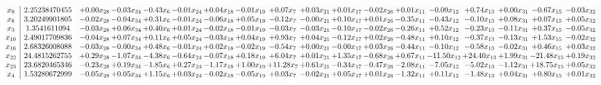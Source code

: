 \documentclass[9pt]{article}
\begin{document}
 \[\begin{array}{c| c c@{\hskip 2pt} c@{\hskip 2pt} c@{\hskip 2pt} c@{\hskip 2pt} c@{\hskip 2pt} c@{\hskip 2pt} c@{\hskip 2pt} c@{\hskip 2pt} c@{\hskip 2pt} c@{\hskip 2pt} c@{\hskip 2pt} c@{\hskip 2pt} c@{\hskip 2pt} c@{\hskip 2pt} c@{\hskip 2pt} c@{\hskip 2pt} }
 x_{9}   &  2.25238470455 & +  0.00 x_{28} & -0.03 x_{34} & -0.43 x_{6} & -0.01 x_{24} & +  0.04 x_{18} & -0.01 x_{19} & +  0.07 x_{7} & +  0.03 x_{21} & +  0.01 x_{17} & -0.02 x_{26} & +  0.01 x_{11} & -0.09 x_{12} & +  0.74 x_{13} & +  0.00 x_{31} & -0.67 x_{15} & -0.03 x_{32}\\
 x_{8}   &  3.20249901805 & -0.02 x_{28} & -0.04 x_{34} & +  0.31 x_{6} & -0.01 x_{24} & -0.06 x_{18} & +  0.05 x_{19} & -0.12 x_{7} & -0.00 x_{21} & +  0.10 x_{17} & +  0.01 x_{26} & -0.35 x_{11} & -0.43 x_{12} & -0.10 x_{13} & +  0.08 x_{31} & +  0.07 x_{15} & +  0.05 x_{32}\\
 x_{3}   &  1.3541611094 & -0.03 x_{28} & +  0.06 x_{34} & +  0.40 x_{6} & +  0.01 x_{24} & -0.02 x_{18} & -0.01 x_{19} & -0.03 x_{7} & -0.03 x_{21} & -0.10 x_{17} & -0.02 x_{26} & -0.26 x_{11} & +  0.52 x_{12} & -0.23 x_{13} & -0.11 x_{31} & +  0.37 x_{15} & -0.05 x_{32}\\
 x_{10}   &  2.49017709836 & -0.04 x_{28} & +  0.07 x_{34} & +  0.11 x_{6} & +  0.05 x_{24} & -0.03 x_{18} & +  0.04 x_{19} & +  0.93 x_{7} & +  0.04 x_{21} & -0.12 x_{17} & +  0.02 x_{26} & -0.48 x_{11} & +  0.10 x_{12} & -0.37 x_{13} & -0.13 x_{31} & +  1.53 x_{15} & -0.02 x_{32}\\
 x_{16}   &  2.68326008088 & -0.03 x_{28} & -0.00 x_{34} & +  0.48 x_{6} & -0.01 x_{24} & +  0.02 x_{18} & -0.02 x_{19} & -0.54 x_{7} & +  0.00 x_{21} & -0.00 x_{17} & +  0.03 x_{26} & -0.44 x_{11} & -0.10 x_{12} & -0.58 x_{13} & -0.02 x_{31} & +  0.46 x_{15} & +  0.03 x_{32}\\
 x_{22}   &  24.4815262755 & +  0.29 x_{28} & -1.07 x_{34} & -4.38 x_{6} & -0.64 x_{24} & -0.07 x_{18} & +  0.18 x_{19} & +  6.04 x_{7} & +  0.01 x_{21} & +  1.35 x_{17} & -0.68 x_{26} & +  0.67 x_{11} & -11.50 x_{12} & + 24.40 x_{13} & +  1.99 x_{31} & -21.48 x_{15} & +  0.19 x_{32}\\
 x_{23}   &  23.6820465346 & -0.23 x_{28} & +  0.19 x_{34} & -1.85 x_{6} & +  0.27 x_{24} & -1.17 x_{18} & +  1.00 x_{19} & + 11.28 x_{7} & +  0.61 x_{21} & -0.34 x_{17} & -0.47 x_{26} & -2.08 x_{11} & -7.05 x_{12} & -5.02 x_{13} & -1.12 x_{31} & + 18.75 x_{15} & +  0.05 x_{32}\\
 x_{4}   &  1.53280672999 & -0.05 x_{28} & +  0.05 x_{34} & +  1.15 x_{6} & +  0.03 x_{24} & -0.02 x_{18} & -0.05 x_{19} & +  0.03 x_{7} & -0.02 x_{21} & +  0.05 x_{17} & +  0.01 x_{26} & -1.32 x_{11} & +  0.11 x_{12} & -1.48 x_{13} & +  0.04 x_{31} & +  0.80 x_{15} & +  0.01 x_{32}\\

\end{array}\]
\end{document}
